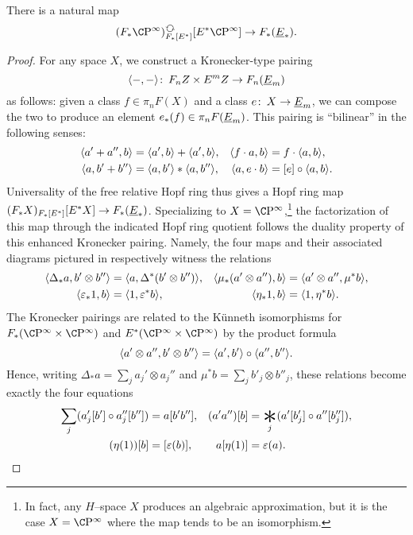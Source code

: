 \begin{lemma}\label{HopfRingComparisonMap}
There is a natural map \[(F_* \CP^\infty)_{F_*[E^*]}^{\circulatearrows}[E^* \CP^\infty] \to F_*(\OS{E}{*}).\]
\end{lemma}
\begin{proof}
For any space \(X\), we construct a Kronecker-type pairing \[\langle-,-\rangle\colon\thinspace F_n Z \times E^m Z \to F_n(\underline{\smash{E}}_{m})\] as follows: given a class \(f \in \pi_n F(X)\) and a class \(e\colon\thinspace X \to \underline{\smash{E}}_{m}\), we can compose the two to produce an element \(e_*(f) \in \pi_n F(\underline{\smash{E}}_{m})\).  This pairing is ``bilinear'' in the following senses:
\begin{align*}
\langle a' + a'', b\rangle & = \langle a', b\rangle + \langle a', b\rangle, &
\langle f \cdot a, b\rangle & = f \cdot \langle a, b\rangle, \\
\langle a, b' + b''\rangle & = \langle a, b'\rangle \ast \langle a, b''\rangle, &
\langle a, e \cdot b\rangle & = [e] \circ \langle a, b\rangle.
\end{align*}
Universality of the free relative Hopf ring thus gives a Hopf ring map \((F_* X)_{F_*[E^*]}[E^* X] \to F_*(\underline{\smash{E}}_{*})\).  Specializing to \(X = \CP^\infty\),\footnote{In fact, any $H$--space $X$ produces an algebraic approximation, but it is the case $X = \CP^\infty$ where the map tends to be an isomorphism.} the factorization of this map through the indicated Hopf ring quotient follows the duality property of this enhanced Kronecker pairing.  Namely, the four maps and their associated diagrams pictured in  respectively witness the relations
\begin{align*}
\langle\Delta_* a, b' \otimes b''\rangle & = \langle a, \Delta^*(b' \otimes b'')\rangle, &
\langle\mu_*(a' \otimes a''), b\rangle & = \langle a' \otimes a'', \mu^* b\rangle, \\
\langle\varepsilon_* 1, b\rangle & = \langle1, \varepsilon^* b\rangle, &
\langle\eta_* 1, b\rangle & = \langle1, \eta^* b\rangle.
\end{align*}
The Kronecker pairings are related to the K\"unneth isomorphisms for \(F_*(\CP^\infty \times \CP^\infty)\) and \(E^*(\CP^\infty \times \CP^\infty)\) by the product formula \[\langle a' \otimes a'', b' \otimes b''\rangle = \langle a', b'\rangle \circ \langle a'', b''\rangle.\]  Hence, writing \(\Delta_* a = \sum_j a_j' \otimes a_j''\) and \(\mu^* b = \sum_j b'_j \otimes b''_j\), these relations become exactly the four equations
\begin{align*}
\sum_j (a'_j[b'] \circ a''_j[b'']) & = a[b'b''], &
(a' a'')[b] & = \bigast_j (a'[b'_j] \circ a''[b''_j]), \\
(\eta(1))[b] & = [\eps(b)], &
a[\eta(1)] & = \eps(a).
\qedhere
\end{align*}
\end{proof}

